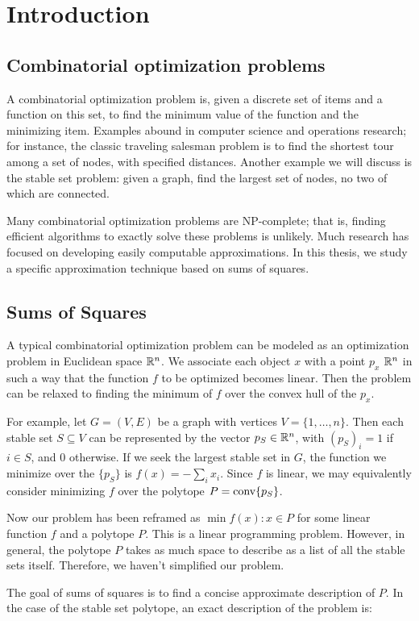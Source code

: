 


\chapter{Introduction}
\label{chap:Introduction}

\section{Combinatorial optimization problems}

A combinatorial optimization problem is, given a discrete set of items and a 
function on this set, to find the minimum value of the function and the
minimizing item. Examples abound in computer science and operations research;
for instance, the classic traveling salesman problem is to find the shortest
tour among a set of nodes, with specified distances. Another example we will
discuss is the stable set problem: given a graph, find the largest set of
nodes, no two of which are connected. 

Many combinatorial optimization problems are NP-complete; that is, finding
efficient algorithms to exactly solve these problems is unlikely. Much research
has focused on developing easily computable approximations. In this thesis,
we study a specific approximation technique based on sums of squares.

\section{Sums of Squares}

A typical combinatorial optimization problem can be modeled as an optimization
problem in Euclidean space $\mathbb{R}^n$. We associate each object $x$ with a point
$p_x$ 
$\mathbb{R}^n$ in such a way that the function $f$ to be optimized becomes linear. Then
the problem can be relaxed to finding the minimum of $f$ over the convex hull
of the $p_x$.

For example, let $G=(V,E)$ be a graph with vertices $V = \{1,\ldots,n\}$.
Then each stable set $S \subseteq V$ can be represented by the vector $p_S \in 
\mathbb{R}^n$, with $(p_S)_i = 1$ if $i \in S$, and 0 otherwise. If we seek the 
largest stable set in $G$, the function we minimize over the $\{p_S\}$ is 
$f(x)= - \sum_{i} x_i$. Since $f$ is linear, we may equivalently consider
minimizing $f$ over the polytope $P = \hbox{conv} \{p_S\}$.

Now our problem has been reframed as $\min f(x): x \in P$ for some linear
function $f$ and a polytope $P$. This is a linear programming problem. 
However, in general, the polytope $P$ takes as much space to describe as a 
list of all the stable sets itself. Therefore, we haven't simplified our
problem.

The goal of sums of squares is to find a concise approximate description of 
$P$. In the case of the stable set polytope, an exact description of the 
problem is:

